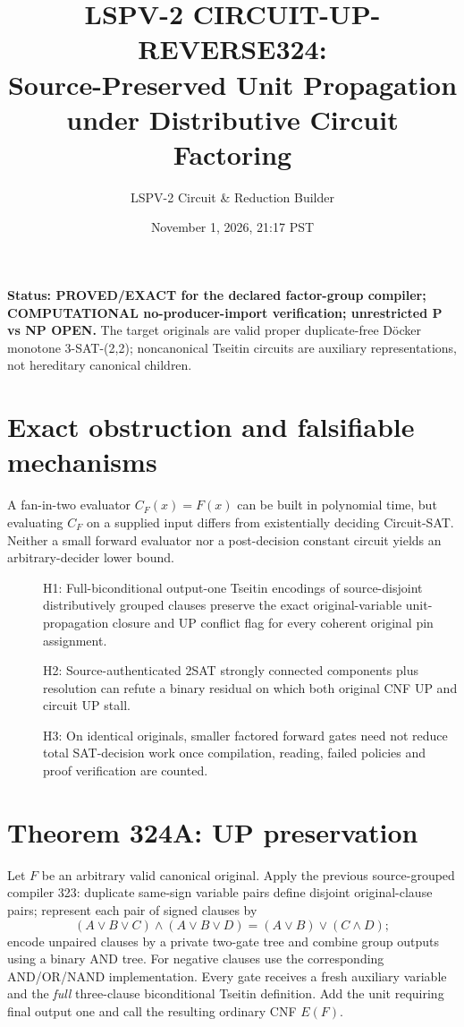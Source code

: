 \documentclass[11pt]{article}
\title{LSPV-2 CIRCUIT-UP-REVERSE324:\\Source-Preserved Unit Propagation under Distributive Circuit Factoring}
\author{LSPV-2 Circuit \& Reduction Builder}
\date{November 1, 2026, 21:17 PST}
\begin{document}
\maketitle
\noindent\textbf{Status: PROVED/EXACT for the declared factor-group compiler; COMPUTATIONAL no-producer-import verification; unrestricted P vs NP OPEN.}
The target originals are valid proper duplicate-free D\"ocker monotone 3-SAT-(2,2); noncanonical Tseitin circuits are auxiliary representations, not hereditary canonical children.

\section{Exact obstruction and falsifiable mechanisms}
A fan-in-two evaluator $C_F(x)=F(x)$ can be built in polynomial time, but evaluating $C_F$ on a supplied input differs from existentially deciding Circuit-SAT. Neither a small forward evaluator nor a post-decision constant circuit yields an arbitrary-decider lower bound.
\begin{description}
\item[] H1: Full-biconditional output-one Tseitin encodings of source-disjoint distributively grouped clauses preserve the exact original-variable unit-propagation closure and UP conflict flag for every coherent original pin assignment.
\item[] H2: Source-authenticated 2SAT strongly connected components plus resolution can refute a binary residual on which both original CNF UP and circuit UP stall.
\item[] H3: On identical originals, smaller factored forward gates need not reduce total SAT-decision work once compilation, reading, failed policies and proof verification are counted.
\end{description}

\section{Theorem 324A: UP preservation}
Let $F$ be an arbitrary valid canonical original. Apply the previous source-grouped compiler 323: duplicate same-sign variable pairs define disjoint original-clause pairs; represent each pair of signed clauses by
\[
(A\vee B\vee C)\wedge(A\vee B\vee D)
=(A\vee B)\vee(C\wedge D);
\]
encode unpaired clauses by a private two-gate tree and combine group outputs using a binary AND tree. For negative clauses use the corresponding AND/OR/NAND implementation. Every gate receives a fresh auxiliary variable and the \emph{full} three-clause biconditional Tseitin definition. Add the unit requiring final output one and call the resulting ordinary CNF $E(F)$.
\end{document}
